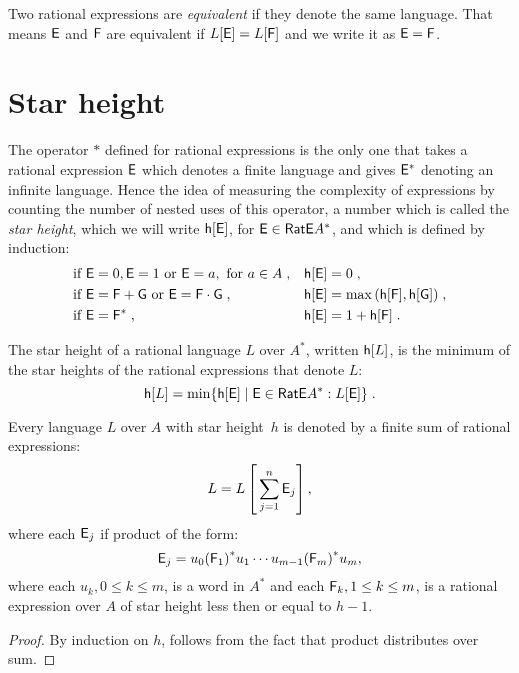 Two rational expressions are \emph{equivalent} if they denote the same language. That means ${\mathsf{E}}$ and ${\mathsf{F}}$ are equivalent if $L[{\mathsf{E}}] = L[{\mathsf{F}}]$ and we write it as ${\mathsf{E}} = {\mathsf{F}}$.

\section{Star height}

The operator $*$ defined for rational expressions is the only one that takes a rational expression ${\mathsf{E}}$ which denotes a finite language and gives ${\mathsf{E^*}}$ denoting an infinite language.  Hence the idea of measuring the complexity of expressions by counting the number of nested uses of this operator, a number which is called the \emph{star height}, which we will write ${\mathsf{h}[{\mathsf{E}}]}$, for ${\mathsf{E}} \in {\mathsf{RatE}} A^*$, and which is defined by induction:
\begin{align*}
    &\text{if } {\mathsf{E}} = 0, {\mathsf{E}} = 1 \text{ or } {\mathsf{E}} = a, \text{ for } a \in A \; , & &{\mathsf{h}[{\mathsf{E}}]} = 0 \; , \\
    &\text{if } {\mathsf{E}} = {\mathsf{F}} + {\mathsf{G}} \text{ or } {\mathsf{E}} = {\mathsf{F}} \cdot {\mathsf{G}}\; , & &{\mathsf{h}[{\mathsf{E}}]} = \max{({\mathsf{h}[{\mathsf{F}}]}, {\mathsf{h}[{\mathsf{G}}]})} \; , \\
    &\text{if } {\mathsf{E}} = {\mathsf{F}}^* \; , & &{\mathsf{h}[{\mathsf{E}}]} = 1 + {\mathsf{h}[{\mathsf{F}}]} \; .
\end{align*}

The star height of a rational language $L$ over $A^*$, written ${\mathsf{h}[L]}$, is the minimum of the star heights of the rational expressions that denote $L$:
\[
    {\mathsf{h}[L]} = \min \{ {\mathsf{h}[{\mathsf{E}}]} \mid {\mathsf{E}} \in {\mathsf{RatE}} A^*: L[{\mathsf{E}}] \} \; .
\]

\begin{lemma}\label{lm:star_height_distributivity}
    Every language $L$ over $A$ with star height~$h$ is denoted by a finite sum of rational expressions:
    \[
        L = L \left[ \, \sum_{j=1}^n {\mathsf{E}}_j \right] ,
    \]
    where each ${\mathsf{E}}_j$ if product of the form:
    \[
        {\mathsf{E}}_j = u_0{({\mathsf{F}}_1)}^*u_1 \dotsm u_{m-1}{({\mathsf{F}}_m)}^*u_m,
    \]
    where each $u_k, 0 \leq k \leq m$, is a word in $A^*$ and each ${\mathsf{F}}_k, 1 \leq k \leq m$, is a rational expression over $A$ of star height less then or equal to $h-1$.
\end{lemma}

\begin{proof}
    By induction on $h$, follows from the fact that product distributes over sum. 
\end{proof}

